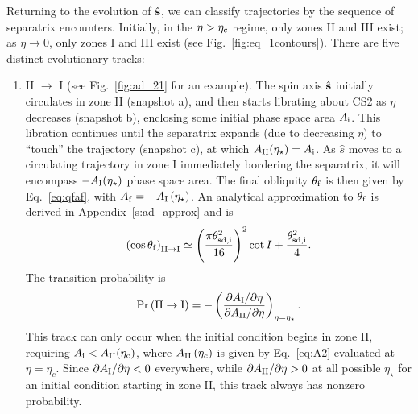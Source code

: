Returning to the evolution of $\hat{\boldsymbol{\mathbf{s}}}$, we can classify trajectories by the
sequence of separatrix encounters. Initially, in the $\eta > \eta_{\rm c}$
regime, only zones II and III exist; as $\eta \to 0$, only zones I and III exist
(see Fig.~\ref{fig:eq_1contours}). There are five distinct evolutionary tracks:
\begin{enumerate}
    \item II $\to$ I (see Fig.~\ref{fig:ad_21} for an example). The spin axis
        $\hat{\boldsymbol{\mathbf{s}}}$ initially circulates in zone II (snapshot a), and then starts
        librating about CS2 as $\eta$ decreases (snapshot b), enclosing some
        initial phase space area $A_{\rm i}$. This libration continues until the
        separatrix expands (due to decreasing $\eta$) to ``touch'' the
        trajectory (snapshot c), at which $A_{\rm II}(\eta_\star) = A_{\rm i}$.
        As $\hat{s}$ moves to a circulating trajectory in zone I immediately
        bordering the separatrix, it will encompass $-A_{\rm I}(\eta_\star)$
        phase space area. The final obliquity $\theta_{\rm f}$ is then given by
        Eq.~\eqref{eq:qfaf}, with $A_{\rm f} = -A_{\rm I}\left(\eta_\star\right)$. An
        analytical approximation to $\theta_{\rm f}$ is derived in
        Appendix~\ref{s:ad_approx} and is
        \begin{equation}
            \p{\cos \theta_{\rm f}}_{\rm II \to I} \simeq
                \p{\frac{\pi \theta_{\rm sd, i}^2}{16}}^2 \cot I
                    + \frac{\theta_{\rm sd, i}^2}{4}.\label{eq:qf_21_approx}
        \end{equation}
        The transition probability is
        \begin{equation}
            \Pr\p{\mathrm{II} \to \mathrm{I}} = -\p{
                \frac{\pdil{A_{\rm I}}{\eta}}{\pdil{A_{\rm II}}{\eta}}}
                    _{\eta = \eta_{\star}}.
        \end{equation}
        This track can only occur when the initial condition begins in zone II,
        requiring $A_{\rm i} < A_{\rm II}(\eta_{\rm c})$, where $A_{\rm
        II}\left(\eta_c\right)$ is given by Eq.~\eqref{eq:A2} evaluated at $\eta =
        \eta_c$. Since $\partial A_{\rm I} / \partial\eta < 0$ everywhere, while
        $\partial A_{\rm II} / \partial\eta > 0$ at all possible $\eta_\star$ for an
        initial condition starting in zone II, this track always has nonzero
        probability.


\end{enumerate}
